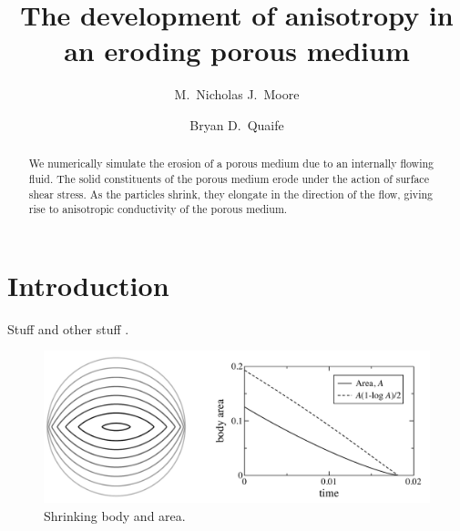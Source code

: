 \documentclass[3p]{elsarticle}
\begin{document}
\title{The development of anisotropy in an eroding porous medium}
%
\author[Nick]{M.~Nicholas J.~Moore}
\author[Bryan]{Bryan D.~Quaife}
\address[Nick]{Department of Mathematics and Geophysical Fluid Dynamics Institute, Florida State University, Tallahassee, FL, 32306.}
\address[Bryan]{Department of Scientific Computing and Geophysical Fluid Dynamics Institute, Florida State University, Tallahassee, FL, 32306.}
\begin{abstract}
We numerically simulate the erosion of a porous medium due to an internally flowing fluid. The solid constituents of the porous medium erode under the action of surface shear stress. As the particles shrink, they elongate in the direction of the flow, giving rise to anisotropic conductivity of the porous medium.
\end{abstract}
\maketitle

\newpage
\section{Introduction}
Stuff \cite{Ristroph2012, Moore2013, Huang2015, MooreCPAM2017} and other stuff \cite{Rycroft2016, Mitchell2016}.


\begin{figure}%
\begin{center}
\includegraphics[width = 0.9 \textwidth]{./Figs/fig1.pdf}
\caption{Shrinking body and area.}
\label{fig1}
\end{center}
\end{figure}




\end{document}
